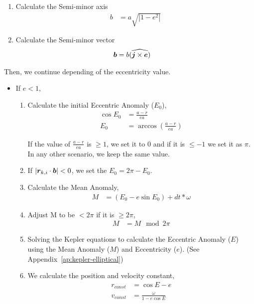 \begin{multicols}{2}
\begin{enumerate}
    \item Calculate the Semi-minor axis
        \begin{align}
            b &= a \sqrt{|1-e^{2}|}
        \end{align}

    \item Calculate the Semi-minor vector
        \begin{align}
            \boldsymbol{b} &= b \widehat{(\boldsymbol{j} \times \boldsymbol{e})}
        \end{align}
\end{enumerate}
\end{multicols}

Then, we continue depending of the eccentricity value.

\begin{itemize}
    \item If $e < 1$,
        \begin{enumerate}
            \item Calculate the initial Eccentric Anomaly ($E_{0}$),
                \begin{align}
                    \cos{E_{0}} &= \frac{a-r}{e a} \\
                          E_{0} &= \arccos{\left(\frac{a-r}{e a}\right)}
                \end{align}

                If the value of $\frac{a-r}{e a}$ is $\geq 1$, we set it
                to $0$ and if it is $\leq -1$ we set it as $\pi$.
                In any other scenario, we keep the same value.

            \item If $|\boldsymbol{r}_{k,i} \cdot \boldsymbol{b}| < 0$,
                we set the $E_{0} = 2\pi - E_{0}$.

            \item Calculate the Mean Anomaly,
                \begin{align}
                    M &= (E_{0} - e \sin{E_{0}} ) + dt * \omega
                \end{align}
            \item Adjust M to be $< 2\pi$ if it is $\geq 2\pi$,
                \begin{align}
                    M &= M \mod 2\pi
                \end{align}

            \item Solving the Kepler equations to calculate the Eccentric Anomaly ($E$)
                using the Mean Anomaly ($M$) and Eccentricity ($e$). (See Appendix~\ref{ap:kepler-elliptical})
            \item We calculate the position and velocity constant,
                \begin{align}
                    r_{const} &= \cos{E} - e \\
                    v_{const} &= \frac{\omega}{1 - e \cos{E}}
                \end{align}


\end{enumerate}
\end{itemize}
